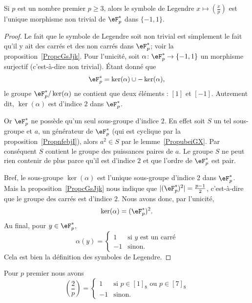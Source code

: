 \begin{lemma}\label{Lemoabzrn}
    Si \( p\) est un nombre premier \( p\geq 3\), alors le symbole de Legendre \( x\mapsto\left(\frac{x}{p}\right)\) est l'unique morphisme non trivial de \( \eF^*_p\) dans \( \{ -1,1 \}\).
\end{lemma}

\begin{proof}
    Le fait que le symbole de Legendre soit non trivial est simplement le fait qu'il y ait des carrés et des non carrés dans \( \eF_p^*\); voir la proposition~\ref{PropcGsJjk}. Pour l'unicité, soit \( \alpha\colon \eF^*_p\to \{ -1,1 \}\) un morphisme surjectif (c'est-à-dire non trivial). Étant donné que
    \begin{equation}
        \eF^*_p=\ker(\alpha)\cup-\ker(\alpha),
    \end{equation}
    le groupe \( \eF_p^*/\ker(\alpha)\) ne contient que deux éléments : \( [1]\) et \( [-1]\). Autrement dit, \( \ker(\alpha)\) est d'indice \( 2\) dans \( \eF_p^*\).

    Or \( \eF_p^*\) ne possède qu'un seul sous-groupe d'indice \( 2\). En effet soit \( S\) un tel sous-groupe et \( a\), un générateur de \( \eF_p^*\) (qui est cyclique par la proposition~\ref{PropnfebjI}), alors \( a^2\in S\) par le lemme~\ref{PropubeiGX}. Par conséquent \( S\) contient le groupe des puissances paires de \( a\). Le groupe $S$ ne peut rien contenir de plus parce qu'il est d'indice \( 2\) et que l'ordre de \( \eF_p^*\) est pair.

    Bref, le sous-groupe \( \ker(\alpha)\) est l'unique sous-groupe d'indice \( 2\) dans \( \eF_p^*\). Mais la proposition~\ref{PropcGsJjk} nous indique que \( | (\eF_p^*)^2 |=\frac{ p-1 }{2}\), c'est-à-dire que le groupe des carrés est d'indice \( 2\). Nous avons donc, par l'unicité,
    \begin{equation}
        \ker(\alpha)=(\eF_p^*)^2.
    \end{equation}
    Au final, pour \( y\in \eF_p^*\),
    \begin{equation}
        \alpha(y)=\begin{cases}
           1 &   \text{si } y\text{ est un carré}\\
            -1    &    \text{sinon.}
        \end{cases}
    \end{equation}
    Cela est bien la définition des symboles de Legendre.
\end{proof}

\begin{proposition}
    Pour \( p\) premier nous avons
    \begin{equation}
        \left(\frac{2}{p}\right)=\begin{cases}
            1    &   \text{si } p\in [1]_8\text{ ou } p\in [7]_8\\
            -1    &    \text{sinon}.
        \end{cases}
    \end{equation}
\end{proposition}

